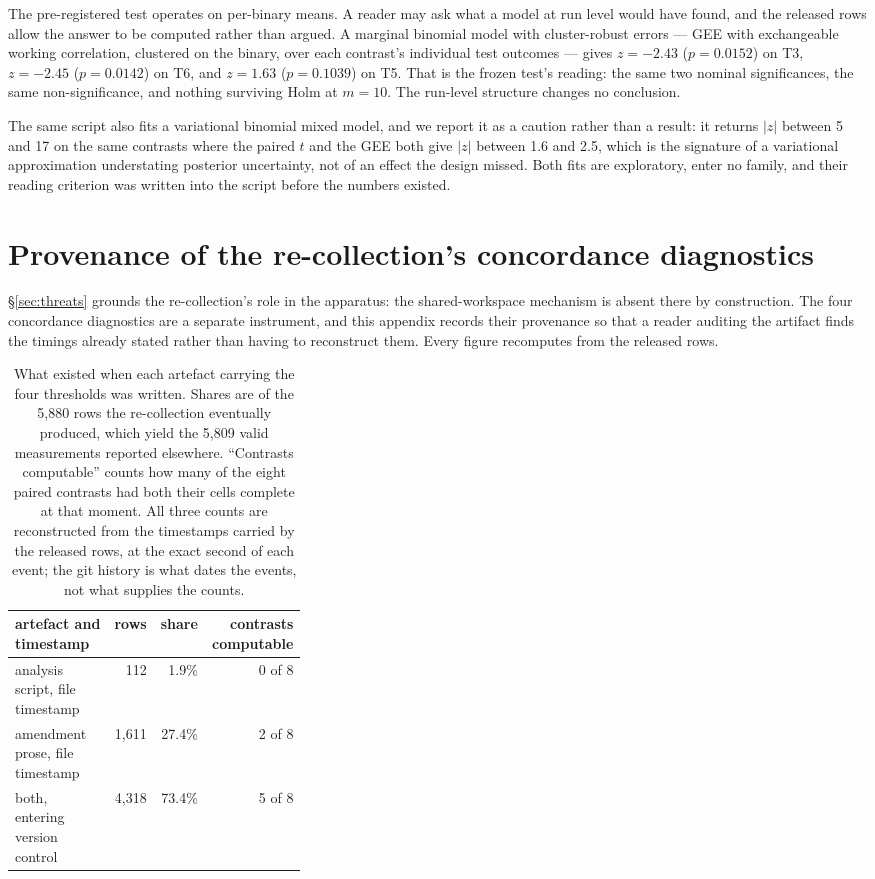 The pre-registered test operates on per-binary means. A reader may ask what a model at run level would
have found, and the released rows allow the answer to be computed rather than argued. A marginal binomial
model with cluster-robust errors --- GEE with exchangeable working correlation, clustered on the binary,
over each contrast's individual test outcomes --- gives $z{=}-2.43$ ($p{=}0.0152$) on T3, $z{=}-2.45$
($p{=}0.0142$) on T6, and $z{=}1.63$ ($p{=}0.1039$) on T5. That is the frozen test's reading: the same two
nominal significances, the same non-significance, and nothing surviving Holm at $m{=}10$. The run-level
structure changes no conclusion.

The same script also fits a variational binomial mixed model, and we report it as a caution rather than a
result: it returns $|z|$ between 5 and 17 on the same contrasts where the paired $t$ and the GEE both give
$|z|$ between 1.6 and 2.5, which is the signature of a variational approximation understating posterior
uncertainty, not of an effect the design missed. Both fits are exploratory, enter no family, and their
reading criterion was written into the script before the numbers existed.

\section{Provenance of the re-collection's concordance diagnostics}
\label{sec:appendice-provenienza}

\S\ref{sec:threats} grounds the re-collection's role in the apparatus: the shared-workspace mechanism is
absent there by construction. The four concordance diagnostics are a separate instrument, and this appendix
records their provenance so that a reader auditing the artifact finds the timings already stated rather
than having to reconstruct them. Every figure recomputes from the released rows.

\begin{table}[h]
\centering
\caption{What existed when each artefact carrying the four thresholds was written. Shares are of the 5{,}880 rows the re-collection
eventually produced, which yield the 5{,}809 valid measurements reported elsewhere. ``Contrasts computable'' counts how many of the eight
paired contrasts had both their cells complete at that moment. All three counts are reconstructed from the
timestamps carried by the released rows, at the exact second of each event; the git history is what dates
the events, not what supplies the counts.}
\label{tab:provenienza}
\footnotesize
\setlength{\tabcolsep}{5pt}
\begin{tabular}{@{}P{0.34\linewidth}rrr@{}}
\toprule
artefact and timestamp & rows & share & contrasts computable \\
\midrule
analysis script, file timestamp & 112 & 1.9\% & 0 of 8 \\
amendment prose, file timestamp & 1{,}611 & 27.4\% & 2 of 8 \\
both, entering version control & 4{,}318 & 73.4\% & 5 of 8 \\
\bottomrule
\end{tabular}
\end{table}

